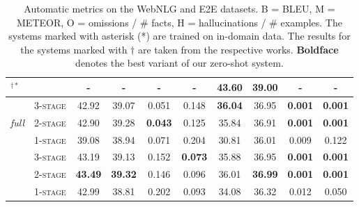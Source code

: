 \documentclass[12pt,notitlepage,a4paper,oneside,openany]{report}
\makeatletter
\def\adl@drawiv#1#2#3{%
  \hskip.5\tabcolsep
  \xleaders#3{#2.5\@tempdimb #1{1}#2.5\@tempdimb}%
  #2\z@ plus1fil minus1fil\relax
  \hskip.5\tabcolsep}
\newcommand{\cdashlinelr}[1]{%
  \noalign{\vskip\aboverulesep
    \global\let\@dashdrawstore\adl@draw
    \global\let\adl@draw\adl@drawiv}
  \cdashline{#1}
  \noalign{\global\let\adl@draw\@dashdrawstore
    \vskip\belowrulesep}}
\makeatother
\begin{document}
\begin{table}[ht]
\begin{tabular}{llcccccccc}
        \multicolumn{2}{l}{\citet{harkousHaveYourText2020}$^{\dagger *}$}\hspace{-2mm} & -                & -                                   & -                                & -              & 43.60          & 39.00          & -              & -                               \\\midrule
        \multirow{3}{*}{\textit{full}}                                                 & \textsc{3-stage} & 42.92                               & 39.07                            & 0.051          & 0.148          & \textbf{36.04} & 36.95          & \textbf{0.001} & \textbf{0.001} \\
                                                                                       & \textsc{2-stage} & 42.90                               & 39.28                            & \textbf{0.043} & 0.125          & 35.84          & 36.91          & \textbf{0.001} & \textbf{0.001} \\
                                                                                       & \textsc{1-stage} & 39.08                               & 38.94                            & 0.071          & 0.204          & 30.81          & 36.01          & 0.009          & 0.122          \\\cdashlinelr{1-10}
        \multirow{3}{*}{\textit{filtered}}                                             & \textsc{3-stage} & 43.19                               & 39.13                            & 0.152          & \textbf{0.073} & 35.88          & 36.95          & \textbf{0.001} & \textbf{0.001} \\
                                                                                       & \textsc{2-stage} & \textbf{43.49}                      & \textbf{39.32}                   & 0.146          & 0.096          & 36.01          & \textbf{36.99} & \textbf{0.001} & \textbf{0.001} \\
                                                                                       & \textsc{1-stage} & 42.99                               & 38.81                            & 0.202          & 0.093          & 34.08          & 36.32          & 0.012          & 0.050          \\ \bottomrule
    \end{tabular}
    \caption[Automatic metrics on the WebNLG and E2E datasets]{Automatic metrics on the WebNLG and E2E datasets. B = BLEU, M = METEOR, O = omissions / \# facts, H = hallucinations / \# examples. The systems marked with asterisk (*) are trained on in-domain data. The results for the systems marked with $\dagger$ are taken from the respective works. \textbf{Boldface} denotes the best variant of our zero-shot system.}
    \label{tab:pipeline:auto}
\end{table}
\end{document}
